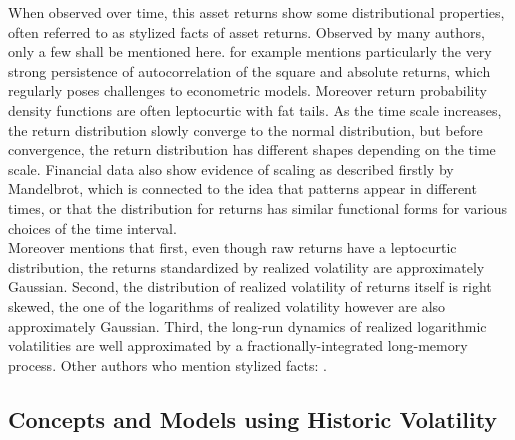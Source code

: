 When observed over time, this asset returns show some distributional properties, often referred to as stylized facts of asset returns. Observed by many authors, only a few shall be mentioned here. \citeauthor{corsi2009} for example mentions particularly the very strong persistence of autocorrelation of the square and absolute returns, which regularly poses challenges to econometric models. Moreover return probability density functions are often leptocurtic with fat tails. As the time scale increases, the return distribution slowly converge to the normal distribution, but before convergence, the return distribution has different shapes depending on the time scale. Financial data also show evidence of scaling as described firstly by Mandelbrot, which is connected to the idea that patterns appear in different times, or that the distribution for returns has similar functional forms for various choices of the time interval. \\
Moreover \citeauthor{andersen2001} mentions that first, even though raw returns have a leptocurtic distribution, the returns standardized by realized volatility are approximately Gaussian. Second, the distribution of realized volatility of returns itself is right skewed, the one of the logarithms of realized volatility however are also approximately Gaussian. Third, the long-run dynamics of realized logarithmic volatilities are well approximated by a fractionally-integrated long-memory process. Other authors who mention stylized facts: \parencite{jiang2003}.

\subsection{Concepts and Models using Historic Volatility}
